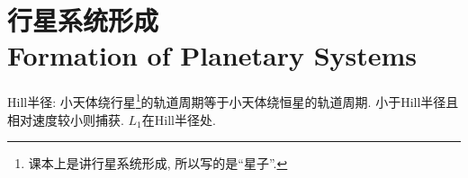 \chapter{行星系统形成\\Formation of Planetary Systems}

Hill半径: 小天体绕行星\footnote{课本上是讲行星系统形成, 所以写的是``星子''.}的轨道周期等于小天体绕恒星的轨道周期. 小于Hill半径且相对速度较小则捕获. $L_1$在Hill半径处.
